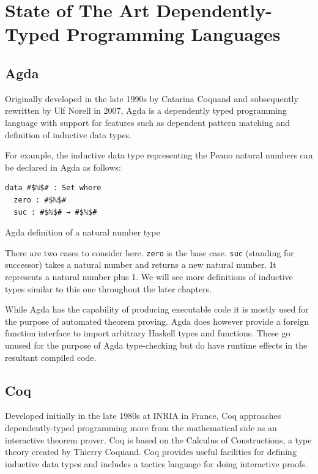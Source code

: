 \documentclass[a4paper, notitlepage]{report}
\begin{document}
\section{State of The Art Dependently-Typed Programming Languages}
\label{sec:org820bb08}
\subsection{Agda}
\label{sec:orgd73ba40}
Originally developed in the late 1990s by Catarina Coquand and subsequently
rewritten by Ulf Norell in 2007, Agda is a dependently typed programming
language with support for features such as dependent pattern matching and
definition of inductive data types.

For example, the inductive data type representing the Peano natural numbers can
be declared in Agda as follows:

\begin{listing}[H]
\begin{verbatim}
data #$ℕ$# : Set where
  zero : #$ℕ$#
  suc : #$ℕ$# → #$ℕ$#
\end{verbatim}
\caption{Agda definition of a natural number type}
\end{listing}

There are two cases to consider here. \texttt{zero} is the base case. \texttt{suc} (standing
for successor) takes a natural number and returns a new natural number. It
represents a natural number plus 1. We will see more definitions of inductive
types similar to this one throughout the later chapters.

While Agda has the capability of producing executable code it is mostly used for
the purpose of automated theorem proving. Agda does however provide a foreign
function interface to import arbitrary Haskell types and functions. These go
unused for the purpose of Agda type-checking but do have runtime effects in the
resultant compiled code.

\subsection{Coq}
\label{sec:orgd668b2e}
Developed initially in the late 1980s at INRIA in France, Coq approaches
dependently-typed programming more from the mathematical side as an interactive
theorem prover. Coq is based on the Calculus of Constructions, a type theory
created by Thierry Coquand. Coq provides useful facilities for defining
inductive data types and includes a tactics language for doing interactive
proofs.
\end{document}

